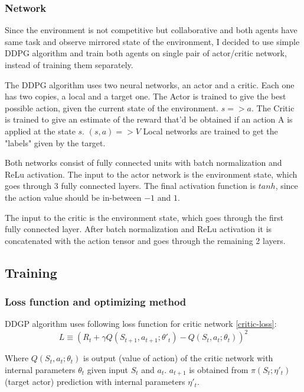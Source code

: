\documentclass{report}
\begin{document}
\subsubsection*{Network}

Since the environment is not competitive but collaborative and both agents have same task and observe mirrored state of the environment, I decided to use simple DDPG algorithm and train both agents on single pair of actor/critic network, instead of training them separately.

The DDPG algorithm uses two neural networks, an actor and a critic. Each one has two copies, a local and a target one. The Actor is trained to give the best possible action, given the current state of the environment. \(s => a\). The Critic is trained to give an estimate of the reward that'd be obtained if an action A is applied at the state \(s\). \((s, a) => V\) Local networks are trained to get the "labels" given by the target.

Both networks consist of fully connected units with batch normalization and ReLu activation. The input to the actor network is the environment state, which goes through 3 fully connected layers. The final activation function is \(tanh\), since the action value should be in-between \(-1\) and \(1\).

The input to the critic is the environment state, which goes through the first fully connected layer. After batch normalization and ReLu activation it is concatenated with the action tensor and goes through the remaining 2 layers.

\subsection*{Training}
\subsubsection*{Loss function and optimizing method}

DDGP algorithm uses following loss function for critic network \ref{critic-loss}:
\begin{equation} \label{critic-loss}
L \equiv (R_t + \gamma Q(S_{t+1}, a_{t+1}; \theta'_t) - Q(S_t, a_t; \theta_t))^{2}
\end{equation}

Where \(Q(S_t, a_t; \theta_t)\) is output (value of action) of the critic network with internal parameters \(\theta_t\) given input \(S_t\) and \(a_t\). \(a_{t+1}\) is obtained from \(\pi(S_t; \eta'_t)\) (target actor) prediction with internal parameters \(\eta'_t\).
\end{document}
